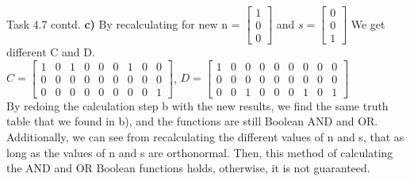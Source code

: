 \documentclass[aspectratio=169]{beamer}
\begin{document}
\begin{frame}{Task 4.7 contd. }
\textbf{c)} By recalculating for new n = $\begin{bmatrix} 1 \\ 0 \\ 0 \end{bmatrix}$   and $s = \begin{bmatrix} 0 \\0 \\ 1 \end{bmatrix}$
We get different C and D.\\
$C = \begin{bmatrix} 1 & 0 & 1& 0 & 0& 0& 1& 0& 0\\ 0& 0& 0& 0& 0& 0& 0& 0& 0\\ 0& 0& 0& 0& 0& 0& 0& 0& 1 \end{bmatrix}$,
$D = \begin{bmatrix} 1 & 0 & 0& 0 & 0& 0& 0& 0& 0\\ 0& 0& 0& 0& 0& 0& 0& 0& 0\\ 0& 0& 1& 0& 0& 0& 1& 0& 1 \end{bmatrix}$
\newline
\\ By redoing the calculation step b with the new results, we find the same truth table that we found in b), and the functions are still Boolean AND and OR.\\

Additionally, we can see from recalculating the different values of n and s, that as long as the values of n and s are orthonormal. Then, this method of calculating the AND and OR Boolean functions holds, otherwise, it is not guaranteed.
\end{frame}


\end{document}
